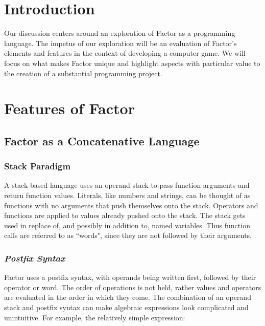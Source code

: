 \documentclass{sig-alternate}
\begin{document}



\section{Introduction}
Our discussion centers around an exploration of Factor as a programming language. 
The impetus of our exploration will be an evaluation of Factor's elements and features in the context of developing a computer game. We will focus on what makes Factor unique and highlight aspects with particular value to the creation of a substantial programming project.

\section{Features of Factor} 
\subsection{Factor as a Concatenative Language}

\subsubsection{Stack Paradigm}
A stack-based language uses an operand stack to pass function arguments and return function values. Literals, like numbers and strings, can be thought of as functions with no arguments that push themselves onto the stack. Operators and functions are applied to values already pushed onto the stack. The stack gets used in replace of, and possibly in addition to, named variables. Thus function calls are referred to as ``words", since they are not followed by their arguments.

\subsubsection*{\textit{Postfix Syntax}}
Factor uses a postfix syntax, with operands being written first, followed by their operator or word. The order of operations is not held, rather values and operators are evaluated in the order in which they come. The combination of an operand stack and postfix syntax can make algebraic expressions look complicated and unintuitive. For example, the relatively simple expression: 
	
\end{document}
